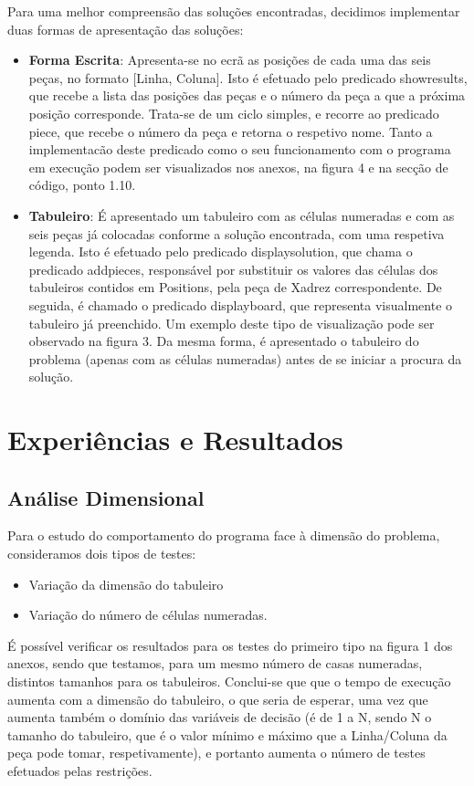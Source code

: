 \documentclass[runningheads]{llncs}
\begin{document}
Para uma melhor compreensão das soluções encontradas, decidimos implementar duas formas de apresentação das soluções:
\begin{itemize}
    \item \textbf{Forma Escrita}:
    Apresenta-se no ecrã as posições de cada uma das seis peças, no formato [Linha, Coluna].
    Isto é efetuado pelo predicado show\textunderscore results, que recebe a lista das posições das peças e o número da peça a que a próxima posição corresponde. Trata-se de um ciclo simples, e recorre ao predicado piece, que recebe o número da peça e retorna o respetivo nome.
    Tanto a implementacão deste predicado como o seu funcionamento com o programa em execução podem ser visualizados nos anexos, na figura 4 e na secção de código, ponto 1.10.
    \item \textbf{Tabuleiro}:
    É apresentado um tabuleiro com as células numeradas e com as seis peças já colocadas conforme a solução encontrada, com uma respetiva legenda.
    Isto é efetuado pelo predicado display\textunderscore solution, que chama o predicado add\textunderscore pieces, responsável por substituir os valores das células dos tabuleiros contidos em Positions, pela peça de Xadrez correspondente. De seguida, é chamado o predicado display\textunderscore board, que representa visualmente o tabuleiro já preenchido. Um exemplo deste tipo de visualização pode ser observado na figura 3.
    Da mesma forma, é apresentado o tabuleiro do problema (apenas com as células numeradas) antes de se iniciar a procura da solução.
\end{itemize}

\newpage
\section{Experiências e Resultados}
\subsection{Análise Dimensional}
Para o estudo do comportamento do programa face à dimensão do problema, consideramos dois tipos de testes: 
\begin{itemize}
    \item Variação da dimensão do tabuleiro
    \item Variação do número de células numeradas.
\end{itemize}

É possível verificar os resultados para os testes do primeiro tipo na figura 1 dos anexos, sendo que testamos, para um mesmo número de casas numeradas, distintos tamanhos para os tabuleiros.
Conclui-se que  que o tempo de execução aumenta com a dimensão do tabuleiro, o que seria de esperar, uma vez que aumenta também o domínio das variáveis de decisão (é de 1 a N, sendo N o tamanho do tabuleiro, que é o valor mínimo e máximo que a Linha/Coluna da peça pode tomar, respetivamente), e portanto aumenta o número de testes efetuados pelas restrições.
\end{document}
